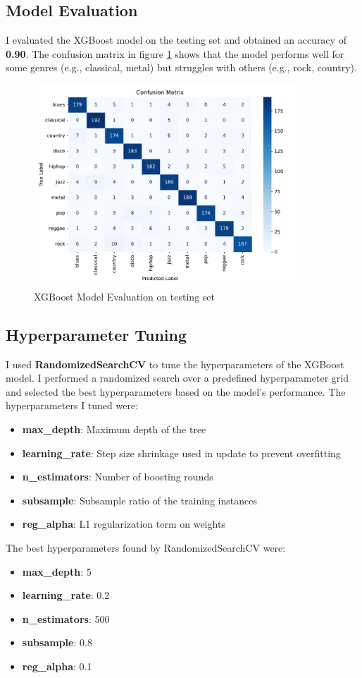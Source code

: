 \documentclass[11.5pt]{article}
\begin{document}
\subsection{Model Evaluation}
I evaluated the XGBoost model on the testing set and obtained an accuracy of \textbf{0.90}. The confusion matrix in figure \ref{fig:xgboost_evaluation} shows that the model performs well for some genres (e.g., classical, metal) but struggles with others (e.g., rock, country).
\begin{figure}[H]
    \centering
    \includegraphics[width=0.9\textwidth]{graphics/confusion_matrix.pdf}
    \caption{XGBoost Model Evaluation on testing set}
    \label{fig:xgboost_evaluation}
\end{figure}

\subsection{Hyperparameter Tuning}
I used \textbf{RandomizedSearchCV} to tune the hyperparameters of the XGBoost model. I performed a randomized search over a predefined hyperparameter grid and selected the best hyperparameters based on the model's performance. The hyperparameters I tuned were:
\begin{itemize}
    \item \textbf{max\_depth}: Maximum depth of the tree
    \item \textbf{learning\_rate}: Step size shrinkage used in update to prevent overfitting
    \item \textbf{n\_estimators}: Number of boosting rounds
    \item \textbf{subsample}: Subsample ratio of the training instances
    \item \textbf{reg\_alpha}: L1 regularization term on weights
\end{itemize}
The best hyperparameters found by RandomizedSearchCV were:
\begin{itemize}
    \item \textbf{max\_depth}: 5
    \item \textbf{learning\_rate}: 0.2
    \item \textbf{n\_estimators}: 500
    \item \textbf{subsample}: 0.8
    \item \textbf{reg\_alpha}: 0.1
\end{itemize}
\end{document}
